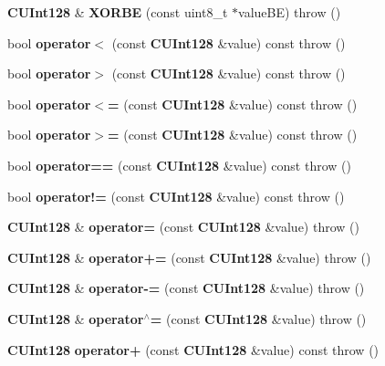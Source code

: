 \begin{DoxyCompactItemize}
\item 
{\bf CUInt128} \& {\bfseries XORBE} (const uint8\_\-t $\ast$valueBE)  throw ()\label{classKademlia_1_1CUInt128_a9cd9b9843fdf46db711908c33b69578e}

\item 
bool {\bfseries operator$<$} (const {\bf CUInt128} \&value) const   throw ()\label{classKademlia_1_1CUInt128_a0d8cadd5bc47cebfec4ebaa1f9e2cd57}

\item 
bool {\bfseries operator$>$} (const {\bf CUInt128} \&value) const   throw ()\label{classKademlia_1_1CUInt128_adbacef0f5c965bf2d0bc48805a9cbf69}

\item 
bool {\bfseries operator$<$=} (const {\bf CUInt128} \&value) const   throw ()\label{classKademlia_1_1CUInt128_a01c962940177895eb05c97c92f3a8130}

\item 
bool {\bfseries operator$>$=} (const {\bf CUInt128} \&value) const   throw ()\label{classKademlia_1_1CUInt128_aef2fd15c6c06a217c660e69f6e460458}

\item 
bool {\bfseries operator==} (const {\bf CUInt128} \&value) const   throw ()\label{classKademlia_1_1CUInt128_a6b8815e1b2a44e6fb6a227ea4f5113bb}

\item 
bool {\bfseries operator!=} (const {\bf CUInt128} \&value) const   throw ()\label{classKademlia_1_1CUInt128_a2595570d2d57592526694852ca7e3b98}

\item 
{\bf CUInt128} \& {\bfseries operator=} (const {\bf CUInt128} \&value)  throw ()\label{classKademlia_1_1CUInt128_ad991c96413c39e6839fb996dd68fcfb0}

\item 
{\bf CUInt128} \& {\bfseries operator+=} (const {\bf CUInt128} \&value)  throw ()\label{classKademlia_1_1CUInt128_a6589c0172c59f7e2390053abe0ff5050}

\item 
{\bf CUInt128} \& {\bfseries operator-\/=} (const {\bf CUInt128} \&value)  throw ()\label{classKademlia_1_1CUInt128_a7510ba3b4e77a5ebed1cc334034d082e}

\item 
{\bf CUInt128} \& {\bfseries operator$^\wedge$=} (const {\bf CUInt128} \&value)  throw ()\label{classKademlia_1_1CUInt128_abc44d3488556b35cadac7bbc3a7959b0}

\item 
{\bf CUInt128} {\bfseries operator+} (const {\bf CUInt128} \&value) const   throw ()\label{classKademlia_1_1CUInt128_a5a00f8caae018385e7a6a91c7465140c}


\end{DoxyCompactItemize}
